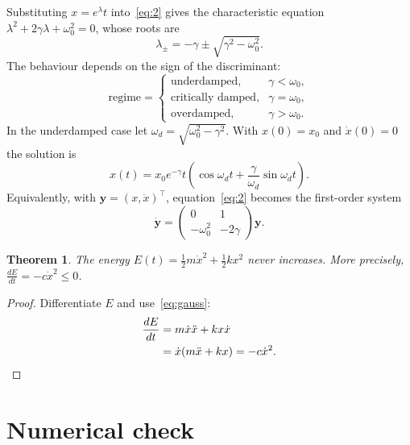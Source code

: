 \documentclass[11pt,a4paper]{article}
\newtheorem{theorem}{Theorem}
\begin{document}
Substituting $x=e^{\lambda}t$ into~\eqref{eq:2} gives the characteristic equation $\lambda^{2}+2\gamma\lambda+\omega_{0}^{2}=0$, whose roots are
\begin{equation}
  \lambda_{\pm}=-\gamma\pm\sqrt{\gamma^{2}-\omega_{0}^{2}}.
\end{equation}
The behaviour depends on the sign of the discriminant:
\begin{equation*}
  \text{regime}=\begin{cases}
\text{underdamped,} & \gamma<\omega_{0}, \\
\text{critically damped,} & \gamma=\omega_{0}, \\
\text{overdamped,} & \gamma>\omega_{0}.
\end{cases}
\end{equation*}
In the underdamped case let $\omega_{d}=\sqrt{\omega_{0}^{2}-\gamma^{2}}$. With $x(0)=x_{0}$ and $\dot{x}(0)=0$ the solution is
\begin{equation}
  x(t)=x_{0}e^{-\gamma}t\left( \cos\omega_{d}t+\frac{\gamma}{\omega_{d}}\sin\omega_{d}t \right).
  \label{eq:cos-dsin}
\end{equation}
Equivalently, with $\mathbf{y}=(x,\dot{x})^{\top}$, equation~\eqref{eq:2} becomes the first-order system
\begin{equation}
  \dot{\mathbf{y}}=\begin{pmatrix}
0 & 1 \\
-\omega_{0}^{2} & -2\gamma
\end{pmatrix}\mathbf{y}.
\end{equation}

\begin{theorem}
  The energy $E(t)=\frac{1}{2}m\dot{x}^{2}+\frac{1}{2}kx^{2}$ never increases. More precisely, $\frac{dE}{dt}=-c\dot{x}^{2}\leq0$.
\end{theorem}

\begin{proof}
  Differentiate $E$ and use~\eqref{eq:gauss}:
\begin{align*}
  \frac{dE}{dt} &=m\dot{x}\ddot{x}+kx\dot{x} \\
   &=\dot{x}(m\ddot{x}+kx)=-c\dot{x}^{2}. \qedhere
\end{align*}
\end{proof}

\section{Numerical check}
\end{document}
